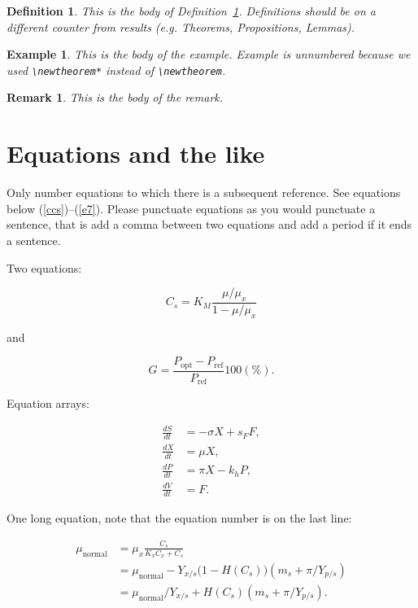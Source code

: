 \documentclass[qe,nameyear,final,openaccess]{econsocart}
\theoremstyle{plain}
\newtheorem{definition}{Definition}[section]
\newtheorem{example}{Example}[section]
\newtheorem{remark}{Remark}[section]
\begin{document}
\begin{definition}\label{de1}This is the body of Definition~\ref{de1}. Definitions should be on a different counter from results (e.g. Theorems, Propositions, Lemmas).

\end{definition}\begin{example}This is the body of the example. Example is unnumbered because we used \texttt{{\textbackslash}newtheorem*}
instead of \texttt{{\textbackslash}newtheorem}.

\end{example}\begin{remark}This is the body of the remark.

\end{remark}\section{Equations and the like}

Only number equations to which there is a subsequent reference.
See equations below (\ref{ccs})--(\ref{e7}). Please punctuate equations as you would punctuate a sentence, that is add a comma between two equations and add a period if it ends a sentence.

Two equations:

\begin{equation}
\label{ccs}
C_{s}  =  K_{M} \frac{\mu/\mu_{x}}{1-\mu/\mu_{x}}
\end{equation}

and

\begin{equation}
G = \frac{P_{\mathrm{opt}} - P_{\mathrm{ref}}}{P_{\mathrm{ref}}}  100(\%).
\end{equation}

Equation arrays:

\begin{align}
  \frac{dS}{dt} & = - \sigma X + s_{F} F,\\
  \frac{dX}{dt} & =   \mu    X,\\
  \frac{dP}{dt} & =   \pi    X - k_{h} P,\\
  \frac{dV}{dt} & =   F.
\end{align}

One long equation, note that the equation number is on the last line:

\begin{equation}
\label{e7}
\begin{aligned}
 \mu_{\text{normal}} & = \mu_{x} \frac{C_{s}}{K_{x}C_{x}+C_{s}} \\
                     & = \mu_{\text{normal}} - Y_{x/s}\bigl(1-H(C_{s})\bigr)(m_{s}+\pi /Y_{p/s})\\
                     & = \mu_{\text{normal}}/Y_{x/s}+ H(C_{s}) (m_{s}+ \pi /Y_{p/s}).
\end{aligned}
\end{equation}
\end{document}

